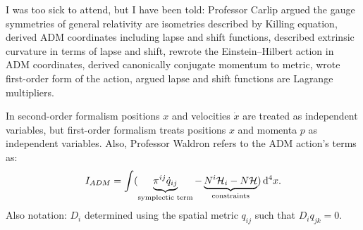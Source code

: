 \lecture

I was too sick to attend, but I have been told: Professor Carlip argued
the gauge symmetries of general relativity are isometries described by
Killing equation, derived ADM coordinates including lapse and shift
functions, described extrinsic curvature in terms of lapse and shift,
rewrote the Einstein--Hilbert action in ADM coordinates, derived canonically
conjugate momentum to metric, wrote first-order form of the action,
argued lapse and shift functions are Lagrange multipliers.

In second-order formalism positions $x$ and velocities $\dot{x}$ are treated as independent
variables, but first-order formalism treats positions $x$ and momenta $p$
as independent variables. Also, Professor Waldron refers to the ADM
action's terms as:
\begin{equation}
I_{ADM} = \int(\underbrace{\pi^{ij}\dot{q}_{ij}}_{\text{symplectic term}}
- \underbrace{N^{i}\mathcal{H}_{i} - N\mathcal{H}}_{\text{constraints}})\,\mathrm{d}^{4}x.
\end{equation}
Also notation: $D_{i}$ determined using the spatial metric $q_{ij}$
such that $D_{i}q_{jk}=0$.
